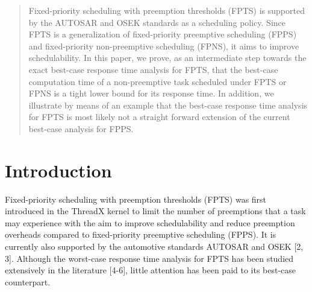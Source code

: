 \documentclass[conference,compsoc]{IEEEtran}
\begin{document}




\maketitle

\begin{abstract}
Fixed-priority scheduling with preemption thresholds (FPTS) is supported by the AUTOSAR and OSEK standards as a scheduling policy. Since FPTS is a generalization of fixed-priority preemptive scheduling (FPPS) and fixed-priority non-preemptive scheduling (FPNS), it aims to improve schedulability. In this paper, we prove, as an intermediate step towards the exact best-case response time analysis for FPTS, that the best-case computation time of a non-preemptive task scheduled under FPTS or FPNS is a tight lower bound for its response time. In addition, we illustrate by means of an example that the best-case response time analysis for FPTS is most likely not a straight forward extension of the current best-case analysis for FPPS.
\end{abstract}




%
\IEEEpeerreviewmaketitle



\section{Introduction}
Fixed-priority scheduling with preemption thresholds (FPTS) was first introduced in the ThreadX kernel \cite{TX} to limit the number of preemptions that a task may experience with the aim to improve schedulability and reduce preemption overheads compared to fixed-priority preemptive scheduling (FPPS). It is currently also supported by the automotive standards AUTOSAR and OSEK [2, 3]. Although the worst-case response time analysis for FPTS has been studied extensively in the literature [4-6], little attention has been paid to its best-case counterpart.
\end{document}
